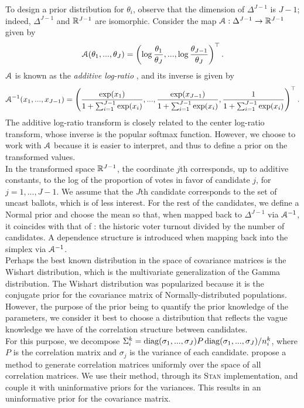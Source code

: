\documentclass{article}
\begin{document}
To design a prior distribution for $\theta_i$, observe that the dimension of $\Delta^{J-1}$ is $J-1$; indeed, $\Delta^{J-1}$ and $\mathbb{R}^{J-1}$ are isomorphic. Consider the map $\mathcal{A}: \Delta^{J-1} \to \mathbb{R}^{J-1}$ given by
\[
  \mathcal{A} (\theta_1, ..., \theta_J) = \left( \log \frac{\theta_1}{\theta_J}, ..., \log \frac{\theta_{J-1}}{\theta_J} \right)^\top.
\]
$\mathcal{A}$ is known as the \textit{additive log-ratio} \citep{aitchison1982}, and its inverse is given by
\[
  \mathcal{A}^{-1} (x_1, ..., x_{J-1}) = \left( \frac{\exp(x_1)}{1 + \sum_{i=1}^{J-1} \exp(x_i)}, ..., \frac{\exp(x_{J-1})}{1 + \sum_{i=1}^{J-1} \exp(x_i)}, \frac{1}{1 + \sum_{i=1}^{J-1} \exp(x_i)} \right)^\top.
\]
The additive log-ratio transform is closely related to the center log-ratio transform, whose inverse is the popular softmax function. However, we choose to work with $\mathcal{A}$ because it is easier to interpret, and thus to define a prior on the transformed values. \\

In the transformed space $\mathbb{R}^{J-1}$, the coordinate $j$th corresponds, up to additive constants, to the log of the proportion of votes in favor of candidate $j$, for $j=1, ..., J-1$. We assume that the $J$th candidate corresponds to the set of uncast ballots, which is of less interest. For the rest of the candidates, we define a Normal prior and choose the mean so that, when mapped back to $\Delta^{J-1}$ via $\mathcal{A}^{-1}$, it coincides with that of \citet{diluvi2018}: the historic voter turnout divided by the number of candidates. A dependence structure is introduced when mapping back into the simplex via $\mathcal{A}^{-1}$.
\\


Perhaps the best known distribution in the space of covariance matrices is the Wishart distribution, which is the multivariate generalization of the Gamma distribution. The Wishart distribution was popularized because it is the conjugate prior for the covariance matrix of Normally-distributed populations. However, the purpose of the prior being to quantify the prior knowledge of the parameters, we consider it best to choose a distribution that reflects the vague knowledge we have of the correlation structure between candidates.
\\

For this purpose, we decompose $\Sigma_i^k = \operatorname{diag}(\sigma_1, ..., \sigma_J) P \operatorname{diag}(\sigma_1, ..., \sigma_J) / n_i^k$, where $P$ is the correlation matrix and $\sigma_j$ is the variance of each candidate. \citet{lewandowski2009} propose a method to generate correlation matrices uniformly over the space of all correlation matrices. We use their method, through its \textsc{Stan} implementation, and couple it with uninformative priors for the variances. This results in an uninformative prior for the covariance matrix.
\\
\end{document}
